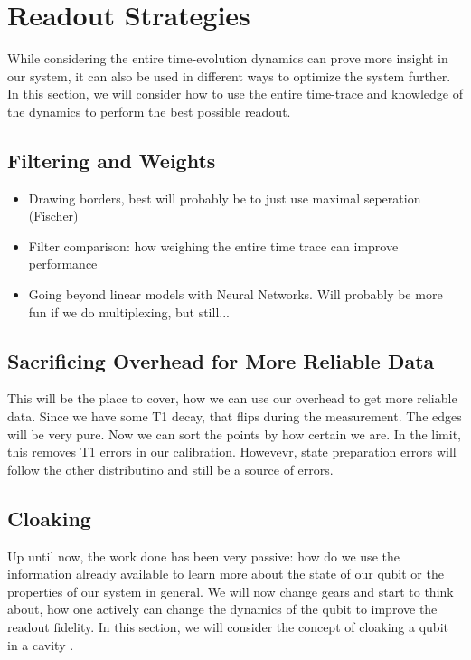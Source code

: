 \chapter{Readout Strategies}
While considering the entire time-evolution dynamics can prove more insight in our system, it can also be used in different ways to optimize the system further. In this section, we will consider how to use the entire time-trace and knowledge of the dynamics to perform the best possible readout.

\section{Filtering and Weights}
\begin{itemize}
    \item Drawing borders, best will probably be to just use maximal seperation (Fischer)
    \item Filter comparison: how weighing the entire time trace can improve performance
    \item Going beyond linear models with Neural Networks. Will probably be more fun if we do multiplexing, but still... 
\end{itemize}


\section{Sacrificing Overhead for More Reliable Data}
This will be the place to cover, how we can use our overhead to get more reliable data. Since we have some T1 decay, that flips during the measurement. The edges will be very pure. Now we can sort the points by how certain we are. In the limit, this removes T1 errors in our calibration. Howevevr, state preparation errors will follow the other distributino and still be a source of errors. 

\section{Cloaking}
Up until now, the work done has been very passive: how do we use the information already available to learn more about the state of our qubit or the properties of our system in general. We will now change gears and start to think about, how one actively can change the dynamics of the qubit to improve the readout fidelity. In this section, we will consider the concept of cloaking a qubit in a cavity \cite{llado}. 

